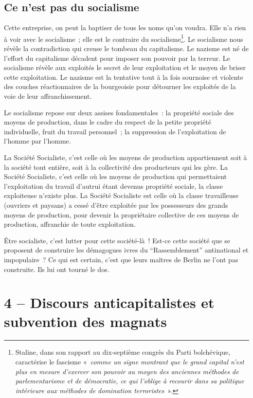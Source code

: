 \documentclass[french,twoside]{book} %
\newcommand\chapteropen{} %
\newcommand\chapterclose{} %
\begin{document}
\section[{Ce n’est pas du socialisme}]{Ce n’est pas du socialisme}
\noindent Cette entreprise, on peut la baptiser de tous les noms qu’on voudra. Elle n’a rien à voir avec le socialisme ; elle est le contraire du socialisme\footnote{Staline, dans son rapport au dix-septième congrès du Parti bolchévique, caractérise le fascisme « \emph{comme un signe montrant que le grand capital n’est plus en mesure d’exercer son pouvoir au moyen des anciennes méthodes de parlementarisme et de démocratie, ce qui l’oblige à recourir dans sa politique intérieure aux méthodes de domination terroristes} ».}. Le socialisme nous révèle la contradiction qui creuse le tombeau du capitalisme. Le nazisme est né de l’effort du capitalisme décadent pour imposer son pouvoir par la terreur. Le socialisme révèle aux exploités le secret de leur exploitation et le moyen de briser cette exploitation. Le nazisme est la tentative tout à la fois sournoise et violente des couches réactionnaires de la bourgeoisie pour détourner les exploités de la voie de leur affranchissement.\par
Le socialisme repose sur deux assises fondamentales : la propriété sociale des moyens de production, dans le cadre du respect de la petite propriété individuelle, fruit du travail personnel ; la suppression de l’exploitation de l’homme par l’homme.\par
La Société Socialiste, c’est celle où les moyens de production appartiennent soit à la société tout entière, soit à la collectivité des producteurs qui les gère. La Société Socialiste, c’est celle où les moyens de production qui permettaient l’exploitation du travail d’autrui étant devenus propriété sociale, la classe exploiteuse n’existe plus. La Société Socialiste est celle où la classe travailleuse (ouvriers et paysans) a cessé d’être exploitée par les possesseurs des grands moyens de production, pour devenir la propriétaire collective de ces moyens de production, affranchie de toute exploitation.\par
Être socialiste, c’est lutter pour cette société-là ! Est-ce cette société que se proposent de construire les démagogues ivres du “Rassemblement” antinational et impopulaire ? Ce qui est certain, c’est que leurs maîtres de Berlin ne l’ont pas construite. Ils lui ont tourné le dos.
\chapterclose


\chapteropen
\chapter[{4 – Discours anticapitalistes et subvention des magnats}]{4 – Discours anticapitalistes et subvention des magnats}\renewcommand{\leftmark}{4 – Discours anticapitalistes et subvention des magnats}
\end{document}
